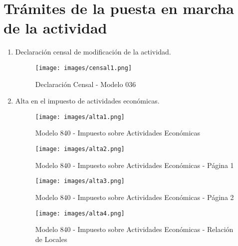 \chapter{Trámites de la puesta en marcha de la actividad}
\label{chap:tramites2}

\begin{enumerate}
\item Declaración censal de modificación de la actividad.

\begin{figure}[h]
  \begin{center}
    \texttt{[image: images/censal1.png]}
    \caption{Declaración Censal - Modelo 036}
    \label{fig:censal1}
  \end{center}
\end{figure}

\item Alta en el impuesto de actividades económicas.

\begin{figure}[h!]
  \begin{center}
    \texttt{[image: images/alta1.png]}
    \caption{Modelo 840 - Impuesto sobre Actividades Económicas}
    \label{fig:alta1}
  \end{center}
\end{figure}

\begin{figure}[p!]
  \begin{center}
    \texttt{[image: images/alta2.png]}
    \caption{Modelo 840 - Impuesto sobre Actividades Económicas - Página 1}
    \label{fig:alta2}
  \end{center}
\end{figure}

\begin{figure}[p!]
  \begin{center}
    \texttt{[image: images/alta3.png]}
    \caption{Modelo 840 - Impuesto sobre Actividades Económicas - Página 2}
    \label{fig:alta3}
  \end{center}
\end{figure}

\begin{figure}[p!]
  \begin{center}
    \texttt{[image: images/alta4.png]}
    \caption{Modelo 840 - Impuesto sobre Actividades Económicas - Relación de Locales}
    \label{fig:alta4}
  \end{center}
\end{figure}


\end{enumerate}
